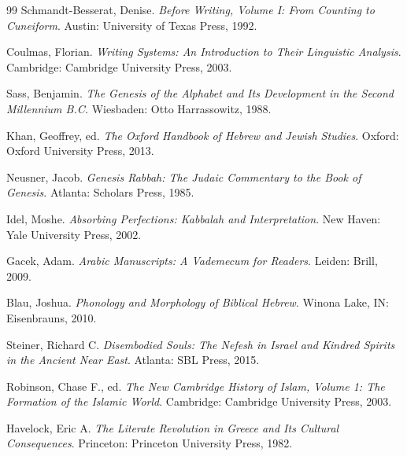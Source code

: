 \documentclass[11pt]{article}
\begin{document}
\begin{thebibliography}{99}
Schmandt-Besserat, Denise. \textit{Before Writing, Volume I: From Counting to Cuneiform}. Austin: University of Texas Press, 1992.

Coulmas, Florian. \textit{Writing Systems: An Introduction to Their Linguistic Analysis}. Cambridge: Cambridge University Press, 2003.

Sass, Benjamin. \textit{The Genesis of the Alphabet and Its Development in the Second Millennium B.C.} Wiesbaden: Otto Harrassowitz, 1988.

Khan, Geoffrey, ed. \textit{The Oxford Handbook of Hebrew and Jewish Studies}. Oxford: Oxford University Press, 2013.

Neusner, Jacob. \textit{Genesis Rabbah: The Judaic Commentary to the Book of Genesis}. Atlanta: Scholars Press, 1985.

Idel, Moshe. \textit{Absorbing Perfections: Kabbalah and Interpretation}. New Haven: Yale University Press, 2002.

Gacek, Adam. \textit{Arabic Manuscripts: A Vademecum for Readers}. Leiden: Brill, 2009.

Blau, Joshua. \textit{Phonology and Morphology of Biblical Hebrew}. Winona Lake, IN: Eisenbrauns, 2010.

Steiner, Richard C. \textit{Disembodied Souls: The Nefesh in Israel and Kindred Spirits in the Ancient Near East}. Atlanta: SBL Press, 2015.

Robinson, Chase F., ed. \textit{The New Cambridge History of Islam, Volume 1: The Formation of the Islamic World}. Cambridge: Cambridge University Press, 2003.

Havelock, Eric A. \textit{The Literate Revolution in Greece and Its Cultural Consequences}. Princeton: Princeton University Press, 1982.

\end{thebibliography}
\end{document}
